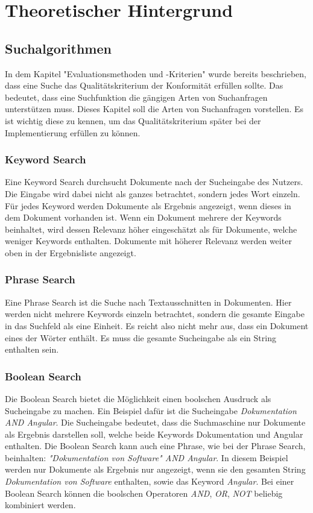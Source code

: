 \chapter{Theoretischer Hintergrund}

\section{Suchalgorithmen}

In dem Kapitel "Evaluationsmethoden und -Kriterien" wurde bereits beschrieben, dass eine Suche das Qualitätskriterium der Konformität erfüllen sollte.
Das bedeutet, dass eine Suchfunktion die gängigen Arten von Suchanfragen unterstützen muss.
Dieses Kapitel soll die Arten von Suchanfragen vorstellen.
Es ist wichtig diese zu kennen, um das Qualitätskriterium später bei der Implementierung erfüllen zu können.

\subsection{Keyword Search}
Eine Keyword Search durchsucht Dokumente nach der Sucheingabe des Nutzers.
Die Eingabe wird dabei nicht als ganzes betrachtet, sondern jedes Wort einzeln.
Für jedes Keyword werden Dokumente als Ergebnis angezeigt, wenn dieses in dem Dokument vorhanden ist.
Wenn ein Dokument mehrere der Keywords beinhaltet, wird dessen Relevanz höher eingeschätzt als für Dokumente, welche weniger Keywords enthalten.
Dokumente mit höherer Relevanz werden weiter oben in der Ergebnisliste angezeigt.

\subsection{Phrase Search}
Eine Phrase Search ist die Suche nach Textausschnitten in Dokumenten.
Hier werden nicht mehrere Keywords einzeln betrachtet, sondern die gesamte Eingabe in das Suchfeld als eine Einheit.
Es reicht also nicht mehr aus, dass ein Dokument eines der Wörter enthält.
Es muss die gesamte Sucheingabe als ein String enthalten sein.

\subsection{Boolean Search}
Die Boolean Search bietet die Möglichkeit einen boolschen Ausdruck als Sucheingabe zu machen.
Ein Beispiel dafür ist die Sucheingabe \textit{Dokumentation AND Angular}.
Die Sucheingabe bedeutet, dass die Suchmaschine nur Dokumente als Ergebnis darstellen soll, welche beide Keywords Dokumentation und Angular enthalten.
Die Boolean Search kann auch eine Phrase, wie bei der Phrase Search, beinhalten: \textit{"Dokumentation von Software" AND Angular}.
In diesem Beispiel werden nur Dokumente als Ergebnis nur angezeigt, wenn sie den gesamten String \textit{Dokumentation von Software} enthalten, sowie das Keyword \textit{Angular}.
Bei einer Boolean Search können die boolschen Operatoren \textit{AND}, \textit{OR}, \textit{NOT} beliebig kombiniert werden.

